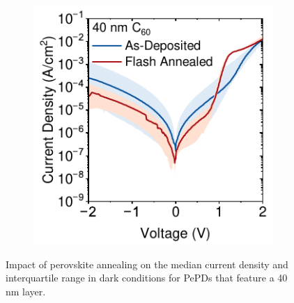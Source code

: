 \begin{figure}[htbp]
    \centering
    \begin{subfigure}[t]{0.5\textwidth}
        \centering
        \includegraphics[width=\textwidth]{chapters/material_properties/images/C60-Compare.pdf} %
                
    \end{subfigure}

    \caption[Impact of perovskite annealing on the median current density and interquartile range in dark conditions for PePDs that feature a 40 nm  layer.]{Impact of perovskite annealing on the median current density and interquartile range in dark conditions for PePDs that feature a 40 nm  layer.}
    \label{fig:et_optim:c60_variability}
\end{figure}

